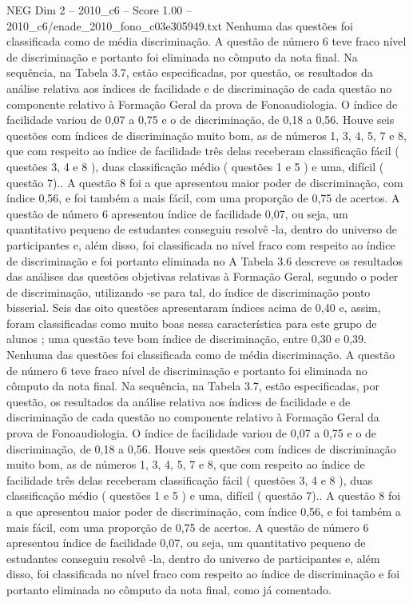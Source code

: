 \begin{textsample}{NEG Dim 2 – 2010\_c6 – Score 1.00 – 2010\_c6/enade\_2010\_fono\_c03e305949.txt}
Nenhuma das questões foi classificada como de média discriminação.
A questão de número 6 teve fraco nível de discriminação e portanto foi eliminada no cômputo da nota final.
Na sequência, na Tabela 3.7, estão especificadas, por questão, os resultados da análise relativa aos índices de facilidade e de discriminação de cada questão no componente relativo à Formação Geral da prova de Fonoaudiologia.
O índice de facilidade variou de 0,07 a 0,75 e o de discriminação, de 0,18 a 0,56.
Houve seis questões com índices de discriminação muito bom, as de números 1, 3, 4, 5, 7 e 8, que com respeito ao índice de facilidade três delas receberam classificação fácil ( questões 3, 4 e 8 ), duas classificação médio ( questões 1 e 5 ) e uma, difícil ( questão 7)..
A questão 8 foi a que apresentou maior poder de discriminação, com índice 0,56, e foi também a mais fácil, com uma proporção de 0,75 de acertos.
A questão de número 6 apresentou índice de facilidade 0,07, ou seja, um quantitativo pequeno de estudantes conseguiu resolvê -la, dentro do universo de participantes e, além disso, foi classificada no nível fraco com respeito ao índice de discriminação e foi portanto eliminada no A Tabela 3.6 descreve os resultados das análises das questões objetivas relativas à Formação Geral, segundo o poder de discriminação, utilizando -se para tal, do índice de discriminação ponto bisserial.
Seis das oito questões apresentaram índices acima de 0,40 e, assim, foram classificadas como muito boas nessa característica para este grupo de alunos ; uma questão teve bom índice de discriminação, entre 0,30 e 0,39.
Nenhuma das questões foi classificada como de média discriminação.
A questão de número 6 teve fraco nível de discriminação e portanto foi eliminada no cômputo da nota final.
Na sequência, na Tabela 3.7, estão especificadas, por questão, os resultados da análise relativa aos índices de facilidade e de discriminação de cada questão no componente relativo à Formação Geral da prova de Fonoaudiologia.
O índice de facilidade variou de 0,07 a 0,75 e o de discriminação, de 0,18 a 0,56.
Houve seis questões com índices de discriminação muito bom, as de números 1, 3, 4, 5, 7 e 8, que com respeito ao índice de facilidade três delas receberam classificação fácil ( questões 3, 4 e 8 ), duas classificação médio ( questões 1 e 5 ) e uma, difícil ( questão 7)..
A questão 8 foi a que apresentou maior poder de discriminação, com índice 0,56, e foi também a mais fácil, com uma proporção de 0,75 de acertos.
A questão de número 6 apresentou índice de facilidade 0,07, ou seja, um quantitativo pequeno de estudantes conseguiu resolvê -la, dentro do universo de participantes e, além disso, foi classificada no nível fraco com respeito ao índice de discriminação e foi portanto eliminada no cômputo da nota final, como já comentado.

\end{textsample}
